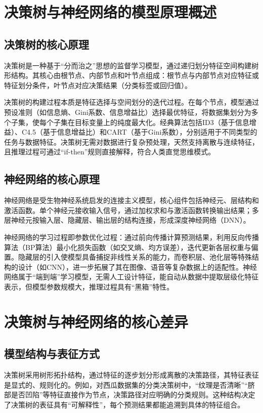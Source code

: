 \section*{决策树与神经网络的模型原理概述}
\subsection*{决策树的核心原理}
决策树是一种基于“分而治之”思想的监督学习模型，通过递归划分特征空间构建树形结构。其核心由根节点、内部节点和叶节点组成：根节点与内部节点对应特征或特征划分条件，叶节点对应决策结果（分类标签或回归值）。

决策树的构建过程本质是特征选择与空间划分的迭代过程。在每个节点，模型通过预设准则（如信息熵、Gini系数、信息增益比）选择最优特征，将数据集划分为多个子集，使每个子集在目标变量上的纯度最大化。经典算法包括ID3（基于信息增益）、C4.5（基于信息增益比）和CART（基于Gini系数），分别适用于不同类型的任务与数据特征\cite{zhou2016machine}。决策树无需对数据进行复杂预处理，天然支持离散与连续特征，且推理过程可通过“if-then”规则直接解释，符合人类直觉思维模式。

\subsection*{神经网络的核心原理}
神经网络是受生物神经系统启发的连接主义模型，核心组件包括神经元、层结构和激活函数。单个神经元接收输入信号，通过加权求和与激活函数转换输出结果；多层神经元按输入层、隐藏层、输出层的结构连接，形成深度神经网络（DNN）。

神经网络的学习过程即参数优化过程：通过前向传播计算预测结果，利用反向传播算法（BP算法）最小化损失函数（如交叉熵、均方误差），迭代更新各层权重与偏置。隐藏层的引入使模型具备捕捉非线性关系的能力，而卷积层、池化层等特殊结构的设计（如CNN），进一步拓展了其在图像、语音等复杂数据上的适配性。神经网络属于“端到端”学习模型，无需人工设计特征，能自动从数据中提取层级化特征表示，但模型参数规模大，推理过程具有“黑箱”特性\cite{zhou2017deepforest}。

\section*{决策树与神经网络的核心差异}
\subsection*{模型结构与表征方式}
决策树采用树形拓扑结构，通过特征的逐步划分形成离散的决策路径，其特征表征是显式的、规则化的。例如，对西瓜数据集的分类决策树中，“纹理是否清晰”“脐部是否凹陷”等特征直接作为节点，决策路径对应明确的分类规则。这种结构决定了决策树的表征具有“可解释性”，每个预测结果都能追溯到具体的特征组合\cite{zhou2018deepforest_review}。

